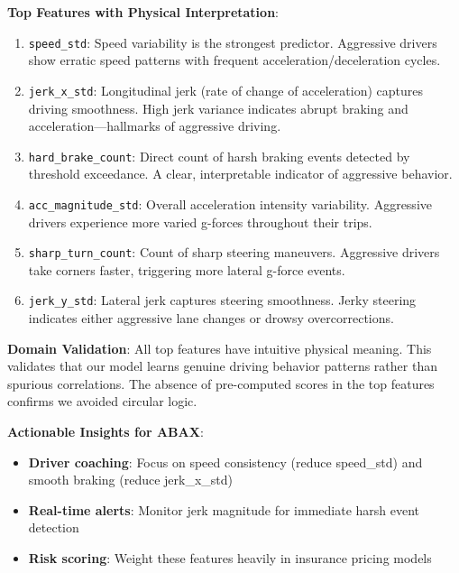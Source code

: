 \documentclass[11pt,a4paper]{article}
\begin{document}
\textbf{Top Features with Physical Interpretation}:
\begin{enumerate}[leftmargin=*]
    \item \texttt{speed\_std}: Speed variability is the strongest predictor. Aggressive drivers show erratic speed patterns with frequent acceleration/deceleration cycles.

    \item \texttt{jerk\_x\_std}: Longitudinal jerk (rate of change of acceleration) captures driving smoothness. High jerk variance indicates abrupt braking and acceleration---hallmarks of aggressive driving.

    \item \texttt{hard\_brake\_count}: Direct count of harsh braking events detected by threshold exceedance. A clear, interpretable indicator of aggressive behavior.

    \item \texttt{acc\_magnitude\_std}: Overall acceleration intensity variability. Aggressive drivers experience more varied g-forces throughout their trips.

    \item \texttt{sharp\_turn\_count}: Count of sharp steering maneuvers. Aggressive drivers take corners faster, triggering more lateral g-force events.

    \item \texttt{jerk\_y\_std}: Lateral jerk captures steering smoothness. Jerky steering indicates either aggressive lane changes or drowsy overcorrections.
\end{enumerate}

\textbf{Domain Validation}: All top features have intuitive physical meaning. This validates that our model learns genuine driving behavior patterns rather than spurious correlations. The absence of pre-computed scores in the top features confirms we avoided circular logic.

\textbf{Actionable Insights for ABAX}:
\begin{itemize}[leftmargin=*]
    \item \textbf{Driver coaching}: Focus on speed consistency (reduce speed\_std) and smooth braking (reduce jerk\_x\_std)
    \item \textbf{Real-time alerts}: Monitor jerk magnitude for immediate harsh event detection
    \item \textbf{Risk scoring}: Weight these features heavily in insurance pricing models
\end{itemize}
\end{document}
